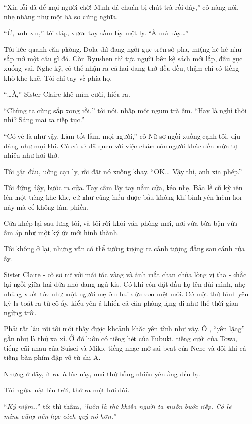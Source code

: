 \documentclass[../main.tex]{subfiles}
\begin{document}
``Xin lỗi đã để mọi người chờ! Mình đã chuẩn bị chút trà rồi đây,'' cô nàng nói, nhẹ nhàng như một bà sơ đúng nghĩa.

``Ừ, anh xin,'' tôi đáp, vươn tay cầm lấy một ly. ``À mà này\dots''

Tôi liếc quanh căn phòng. Dola thì đang ngồi gục trên sô-pha, miệng hé hé như sắp mớ một câu gì đó. Còn Ryushen thì tựa người bên kệ sách mới lắp, đầu gục xuống vai. Nghe kỹ, có thể nhận ra cả hai đang thở đều đều, thậm chí có tiếng khò khe khẽ. Tôi chỉ tay về phía họ.


``\dots À,'' Sister Claire khẽ mỉm cười, hiểu ra.

``Chúng ta cũng sắp xong rồi,'' tôi nói, nhấp một ngụm trà ấm. ``Hay là nghỉ thôi nhỉ? Sáng mai ta tiếp tục.''

``Có vẻ là như vậy. Làm tốt lắm, mọi người,'' cô Nữ sơ ngồi xuống cạnh tôi, dịu dàng như mọi khi. Cô có vẻ đã quen với việc chăm sóc người khác đến mức tự nhiên như hơi thở.

Tôi gật đầu, uống cạn ly, rồi đặt nó xuống khay. ``OK\dots\ Vậy thì, anh xin phép.''

Tôi đứng dậy, bước ra cửa. Tay cầm lấy tay nắm cửa, kéo nhẹ. Bản lề cũ kỹ rên lên một tiếng khe khẽ, cứ như cũng hiểu được bầu không khí bình yên hiếm hoi này mà cố không làm phiền.

Cửa khép lại sau lưng tôi, và tôi rời khỏi văn phòng mới, nơi vừa bừa bộn vừa ấm áp như một ký ức mới hình thành.

Tôi không ở lại, nhưng vẫn có thể tưởng tượng ra cảnh tượng đằng sau cánh cửa ấy.

Sister Claire - cô sơ nữ với mái tóc vàng và ánh mắt chan chứa lòng vị tha - chắc lại ngồi giữa hai đứa nhỏ đang ngủ kia. Có khi còn đặt đầu họ lên đùi mình, nhẹ nhàng vuốt tóc như một người mẹ ôm hai đứa con mệt mỏi. Có một thứ bình yên kỳ lạ toát ra từ cô ấy, kiểu yên ả khiến cả căn phòng lặng đi như thể thời gian ngừng trôi.

Phải rất lâu rồi tôi mới thấy được khoảnh khắc yên tĩnh như vậy. Ở \hll, ``yên lặng'' gần như là thứ xa xỉ. Ở đó luôn có tiếng hét của Fubuki, tiếng cười của Towa, tiếng cãi nhau của Suisei và Miko, tiếng nhạc mở sai beat của Nene và đôi khi cả tiếng bàn phím đập vỡ từ chị A.

Nhưng ở đây, ít ra là lúc này, mọi thứ bỗng nhiên yên ắng đến lạ.

Tôi ngửa mặt lên trời, thở ra một hơi dài.

``\textit{Kỷ niệm\dots}'' tôi thì thầm, ``\textit{luôn là thứ khiến người ta muốn bước tiếp. Có lẽ mình cũng nên học cách quý nó hơn.}''
\omk
\end{document}
